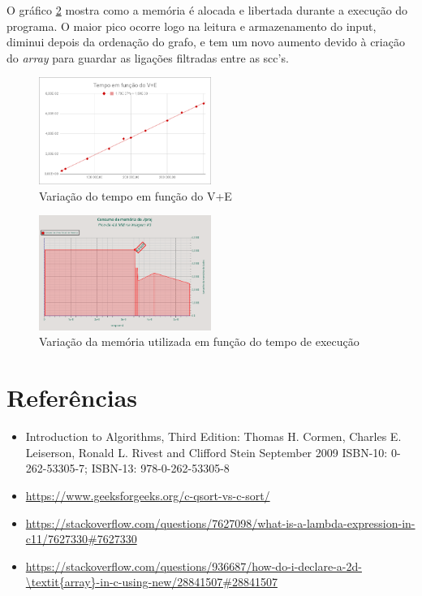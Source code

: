 \documentclass[12pt,a4paper]{article}
\begin{document}
O gráfico \ref{g2} mostra como a memória é alocada e libertada durante a execução do programa. O maior pico ocorre logo na leitura e armazenamento do input, diminui depois da ordenação do grafo, e tem
um novo aumento devido à criação do \textit{array} para guardar as ligações filtradas entre as scc's.
\begin{figure}[h]
			\centering
			\includegraphics[width=0.5\textwidth]{ss_t(V+E)}
			\caption{Variação do tempo em função do V+E}
			\label{g1}
\end{figure}
\begin{figure}[h]
			\centering
			\includegraphics[width=0.5\textwidth]{ss_m(tex)}
			\caption{Variação da memória utilizada em função do tempo de execução}
			\label{g2}
\end{figure}

\section{Referências}
\begin{itemize}
	\item Introduction to Algorithms, Third Edition: Thomas H. Cormen, Charles E. Leiserson, Ronald L. Rivest and Clifford Stein September 2009 ISBN-10: 0-262-53305-7; ISBN-13: 978-0-262-53305-8
	\item \url{https://www.geeksforgeeks.org/c-qsort-vs-c-sort/}
	\item \url{https://stackoverflow.com/questions/7627098/what-is-a-lambda-expression-in-c11/7627330#7627330}
	\item \url{https://stackoverflow.com/questions/936687/how-do-i-declare-a-2d-\textit{array}-in-c-using-new/28841507#28841507}
\end{itemize}
\end{document}
